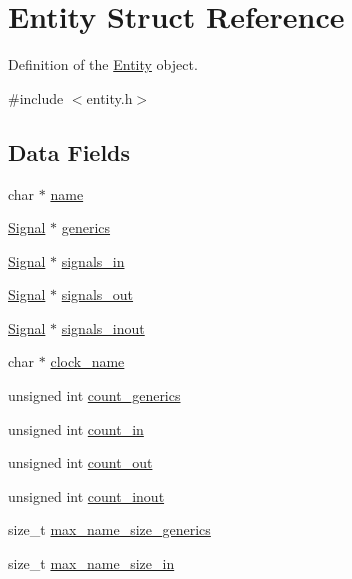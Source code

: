 \hypertarget{struct_entity}{}\section{Entity Struct Reference}
\label{struct_entity}


Definition of the \mbox{\hyperlink{struct_entity}{Entity}} object.  




{\ttfamily \#include $<$entity.\+h$>$}

\subsection*{Data Fields}
\begin{DoxyCompactItemize}
\item 
char $\ast$ \mbox{\hyperlink{struct_entity_a861f653e2ffbe97c0deed7ab85eb7ce6}{name}}
\item 
\mbox{\hyperlink{struct_signal}{Signal}} $\ast$ \mbox{\hyperlink{struct_entity_a92738012e3a6611f840cf0eb2813c2e6}{generics}}
\item 
\mbox{\hyperlink{struct_signal}{Signal}} $\ast$ \mbox{\hyperlink{struct_entity_a52dafc8055e7c6c1b21520fad2d703b2}{signals\+\_\+in}}
\item 
\mbox{\hyperlink{struct_signal}{Signal}} $\ast$ \mbox{\hyperlink{struct_entity_a4b9a333d9fb207c09d9f64e87d986ad6}{signals\+\_\+out}}
\item 
\mbox{\hyperlink{struct_signal}{Signal}} $\ast$ \mbox{\hyperlink{struct_entity_a3a7a0540c9a581600cae6cb8880d4175}{signals\+\_\+inout}}
\item 
char $\ast$ \mbox{\hyperlink{struct_entity_a520135e0c9a911b9d09a47697c58b7ad}{clock\+\_\+name}}
\item 
unsigned int \mbox{\hyperlink{struct_entity_a20a2de116010cce381f1127dae0b2218}{count\+\_\+generics}}
\item 
unsigned int \mbox{\hyperlink{struct_entity_a92911aaab51c820215510b0546570b64}{count\+\_\+in}}
\item 
unsigned int \mbox{\hyperlink{struct_entity_a0cc932f4ed6b00e372488b3a753674ac}{count\+\_\+out}}
\item 
unsigned int \mbox{\hyperlink{struct_entity_a54b70a8bdd98d2752f6ff9f261c552fd}{count\+\_\+inout}}
\item 
size\+\_\+t \mbox{\hyperlink{struct_entity_a8b0c53c2f6867fd1c011210e63efcaad}{max\+\_\+name\+\_\+size\+\_\+generics}}
\item 
size\+\_\+t \mbox{\hyperlink{struct_entity_ae224ddbebe0375e2b802c08ca7f15dda}{max\+\_\+name\+\_\+size\+\_\+in}}

\end{DoxyCompactItemize}
